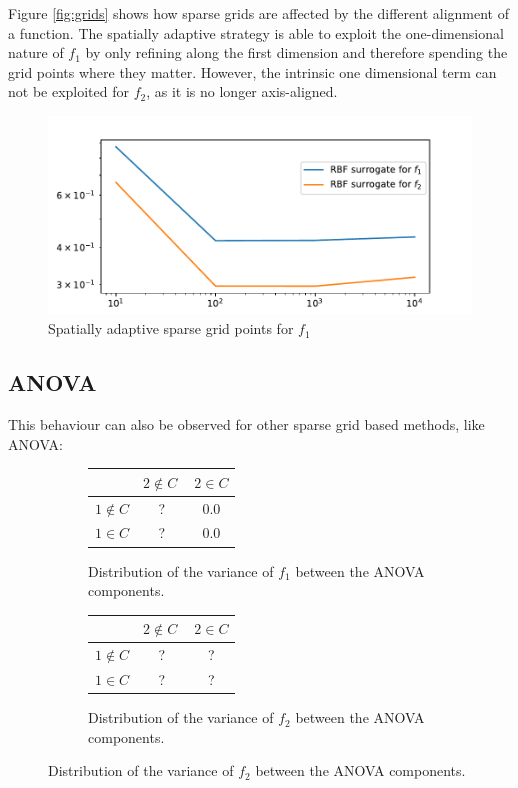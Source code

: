 \documentclass[
  a4paper,  %
  twoside,  %
  bibliography=totoc,
  headsepline,
  cleardoublepage=empty,
  parskip=half,
  draft=false
]{scrbook}
\begin{document}
Figure \ref{fig:grids} shows how sparse grids are affected by the different alignment of a function.
The spatially adaptive strategy is able to exploit the one-dimensional nature of $f_1$ by only refining along the first dimension and therefore spending the grid points where they matter.
However, the intrinsic one dimensional term can not be exploited for $f_2$, as it is no longer axis-aligned.
\begin{figure}[H]
  \centering
  \includegraphics[width=.8\linewidth]{graphics/rbf_errors}
  \caption{Spatially adaptive sparse grid points for $f_1$}
  \label{fig:grid_errors}
\end{figure}


\subsection{ANOVA}
This behaviour can also be observed for other sparse grid based methods, like ANOVA:

\begin{figure}[H]
\begin{subfigure}{.5\textwidth}
  \centering
  \begin{tabular}{ l c c }
\hline \hline
& $2 \notin C~$ & $2 \in C$ \\
\hline
$1 \notin C$ & ? & 0.0\\
$1 \in C$ & ? & 0.0\\
\end{tabular}
  \caption{Distribution of the variance of $f_1$ between the ANOVA components.}
  \label{fig:anova_f1}
\end{subfigure}
\begin{subfigure}{.5\textwidth}
  \centering
  \begin{tabular}{ l c c }
\hline \hline
& $2 \notin C~$ & $2 \in C$ \\
\hline
$1 \notin C$ & ? & ?\\
$1 \in C$ & ? & ?\\
\end{tabular}
  \caption{Distribution of the variance of $f_2$ between the ANOVA components.}
  \label{fig:anova_f2}
\end{subfigure}
\end{figure}
\end{document}
